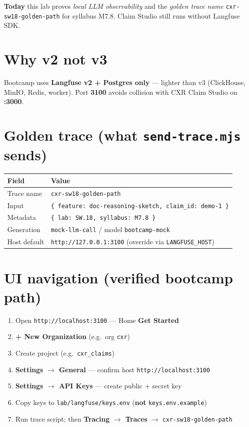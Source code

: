\documentclass[11pt,a4paper]{report}
\begin{document}
\textbf{Today} this lab proves \emph{local LLM observability} and the \emph{golden trace name}
\texttt{cxr-sw18-golden-path} for syllabus M7.8. Claim Studio still runs without Langfuse SDK.

\chapter{Why v2 not v3}

Bootcamp uses \textbf{Langfuse v2 + Postgres only} --- lighter than v3 (ClickHouse, MinIO, Redis, worker).
Port \textbf{3100} avoids collision with CXR Claim Studio on \textbf{:3000}.

\chapter{Golden trace (what \texttt{send-trace.mjs} sends)}

\begin{center}
\begin{tabular}{ll}
\toprule
Field & Value \\
\midrule
Trace name & \texttt{cxr-sw18-golden-path} \\
Input & \texttt{\{ feature: doc-reasoning-sketch, claim\_id: demo-1 \}} \\
Metadata & \texttt{\{ lab: SW.18, syllabus: M7.8 \}} \\
Generation & \texttt{mock-llm-call} / model \texttt{bootcamp-mock} \\
Host default & \texttt{http://127.0.0.1:3100} (override via \texttt{LANGFUSE\_HOST}) \\
\bottomrule
\end{tabular}
\end{center}

\chapter{UI navigation (verified bootcamp path)}

\begin{enumerate}
  \item Open \texttt{http://localhost:3100} --- Home \textbf{Get Started}
  \item \textbf{+ New Organization} (e.g.\ org \texttt{cxr})
  \item Create project (e.g.\ \texttt{cxr\_claims})
  \item \textbf{Settings $\rightarrow$ General} --- confirm host \texttt{http://localhost:3100}
  \item \textbf{Settings $\rightarrow$ API Keys} --- create public + secret key
  \item Copy keys to \texttt{lab/langfuse/keys.env} (\textbf{not} \texttt{keys.env.example})
  \item Run trace script; then \textbf{Tracing $\rightarrow$ Traces} $\rightarrow$ \texttt{cxr-sw18-golden-path}
\end{enumerate}
\end{document}
